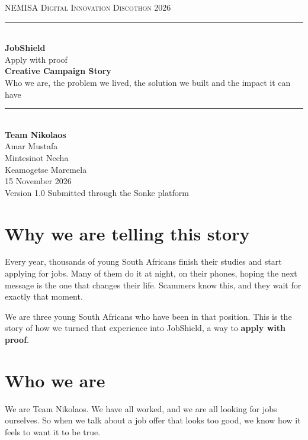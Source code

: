 \documentclass[11pt,a4paper]{article}
\begin{document}
\begin{titlepage}
\thispagestyle{empty}
\centering
\vspace*{2.2cm}
{\large\textsc{NEMISA Digital Innovation Discothon 2026}}\\[0.5cm]
\rule{\textwidth}{0.8pt}\\[1.2cm]
{\fontsize{34}{40}\selectfont\bfseries JobShield}\\[0.5cm]
{\Large Apply with proof}\\[1.4cm]
{\fontsize{20}{24}\selectfont\bfseries Creative Campaign Story}\\[0.4cm]
{\large Who we are, the problem we lived, the solution we built and the impact it can have}\\[1.2cm]
\rule{\textwidth}{0.8pt}\\[2.0cm]
{\large\textbf{Team Nikolaos}}\\[0.5cm]
{\large Amar Mustafa\\[2pt] Mintesinot Necha\\[2pt] Keamogetse Maremela}\\[2.2cm]
{\normalsize 15 November 2026\\[2pt] Version 1.0}
\vfill
{\small Submitted through the Sonke platform}
\end{titlepage}

\setcounter{page}{2}
\renewcommand{\contentsname}{Table of Contents}
\tableofcontents
\clearpage

\setcounter{page}{1}

\section{Why we are telling this story}
Every year, thousands of young South Africans finish their studies and start applying for jobs. Many of them do it at night, on their phones, hoping the next message is the one that changes their life. Scammers know this, and they wait for exactly that moment.

We are three young South Africans who have been in that position. This is the story of how we turned that experience into JobShield, a way to \textbf{apply with proof}.

\section{Who we are}
We are Team Nikolaos. We have all worked, and we are all looking for jobs ourselves. So when we talk about a job offer that looks too good, we know how it feels to want it to be true.
\end{document}
